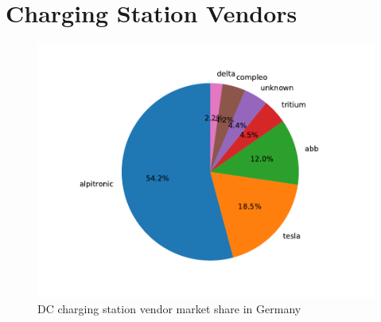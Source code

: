 \documentclass[conference,flushend]{iaria} %
\begin{document}



\section{Charging Station Vendors} \label{sec:chargingstationvendors}
\begin{figure}[ht]
    \centering
    \includegraphics[width=.489\textwidth]{graphs/market_analysis.pdf}
    \caption{DC charging station vendor market share in Germany}
    \label{fig:marketshare}
\end{figure}
\end{document}
